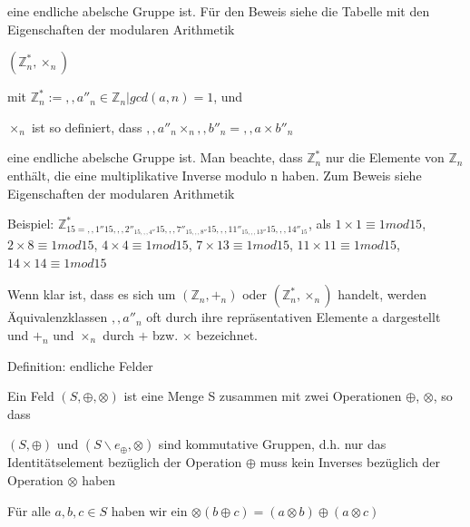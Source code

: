 \documentclass[a4paper]{article}
\begin{document}
\begin{multicols}{3}
\begin{itemize*}
\begin{itemize*}
\begin{itemize*}
                        \item eine endliche abelsche Gruppe ist. Für den Beweis siehe die Tabelle mit den Eigenschaften der modularen Arithmetik
                  \end{itemize*}
                  \item $(\mathbb{Z}^*_n , \times_n)$
                  \begin{itemize*}
                        \item mit $\mathbb{Z}^*_n :={,,a''_n\in \mathbb{Z}_n | gcd(a,n)=1}$, und
                        \item $\times_n$ ist so definiert, dass $,,a''_n\times_n ,,b''_n=,,a\times b''_n$
                        \item eine endliche abelsche Gruppe ist. Man beachte, dass $\mathbb{Z}^*_n$ nur die Elemente von $\mathbb{Z}_n$ enthält, die eine multiplikative Inverse modulo n haben. Zum Beweis siehe Eigenschaften der modularen Arithmetik
                        \item Beispiel: $\mathbb{Z}^*_{{15}={,,1''}{15},,,2''_{{15},,,4''}{15},,,7''_{{15},,,8''}{15},,,11''_{{15},,,13''}{15},,,14''_{15}}$, als $1\times 1\equiv 1 mod 15$, $2 \times 8 \equiv 1 mod 15$, $4 \times 4 \equiv 1 mod 15$, $7 \times 13 \equiv 1 mod 15$, $11 \times 11 \equiv 1 mod 15$, $14 \times 14 \equiv 1 mod 15$ \end{itemize*}
            \end{itemize*}
            \item Wenn klar ist, dass es sich um $(\mathbb{Z}_n, +_n)$ oder $(\mathbb{Z}^*_n,\times_n)$ handelt, werden Äquivalenzklassen $,,a''_n$ oft durch ihre repräsentativen Elemente a dargestellt und $+_n$ und $\times_n$ durch $+$ bzw. $\times$ bezeichnet.
            \begin{itemize*}
                  \item Definition: endliche Felder
                  \begin{itemize*}
                        \item Ein Feld $(S,\oplus, \otimes)$ ist eine Menge S zusammen mit zwei Operationen $\oplus$, $\otimes$, so dass
                        \begin{itemize*}
                              \item $(S,\oplus)$ und $(S\backslash{e_{\oplus}},\otimes)$ sind kommutative Gruppen, d.h. nur das Identitätselement bezüglich der Operation $\oplus$ muss kein Inverses bezüglich der Operation $\otimes$ haben
                              \item Für alle $a,b,c\in S$ haben wir ein $\otimes(b\oplus c)=(a\otimes b)\oplus(a\otimes c)$ \end{itemize*} \end{itemize*}

\end{itemize*}
\end{itemize*}
\end{multicols}
\end{document}
